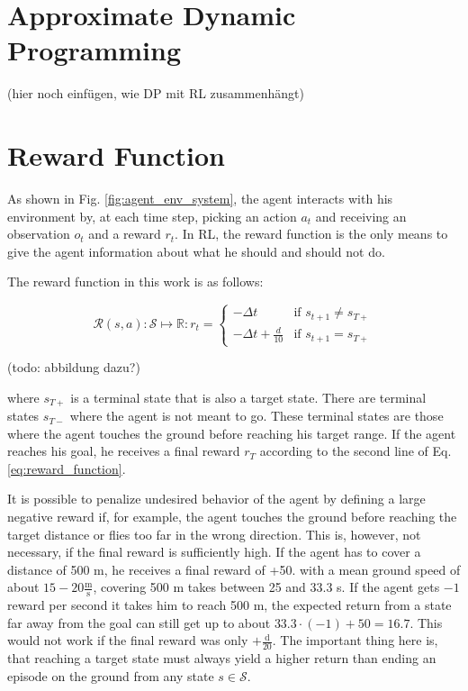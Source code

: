 \section{Approximate Dynamic Programming}

(hier noch einfügen, wie DP mit RL zusammenhängt)

\section{Reward Function}
\label{sec:reward}

As shown in Fig. \ref{fig:agent_env_system}, the agent interacts with his environment by, at each time step, picking an action $a_t$ and receiving an observation $o_t$ and a reward $r_t$. In RL, the reward function is the only means to give the agent information about what he should and should not do.

The reward function in this work is as follows:

\begin{equation}
\mathcal{R}(s,a): \mathcal{S} \mapsto \mathbb{R}: r_t =
\begin{cases}
-\Delta t & \text{if } s_{t+1} \neq s_{T+}\\
-\Delta t + \frac{d}{10} & \text{if } s_{t+1} = s_{T+}
\end{cases}
\label{eq:reward_function}
\end{equation}

(todo: abbildung dazu?)

where $s_{T+}$ is a terminal state that is also a target state. There are terminal states $s_{T-}$ where the agent is not meant to go. These terminal states are those where the agent touches the ground before reaching his target range. If the agent reaches his goal, he receives a final reward $r_T$ according to the second line of Eq. \ref{eq:reward_function}. 

It is possible to penalize undesired behavior of the agent by defining a large negative reward if, for example, the agent touches the ground before reaching the target distance or flies too far in the wrong direction. This is, however, not necessary, if the final reward is sufficiently high. If the agent has to cover a distance of 500 m, he receives a final reward of +50. with a mean ground speed of about $15-20\frac{\text{m}}{\text{s}}$, covering 500 m takes between 25 and 33.3 s. If the agent gets $-1$ reward per second it takes him to reach 500 m, the expected return from a state far away from the goal can still get up to about $33.3\cdot (-1) +50=16.7$. This would not work if the final reward was only $+\frac{\text{d}}{20}$. The important thing here is, that reaching a target state must always yield a higher return than ending an episode on the ground from any state $s \in \mathcal{S}$.


